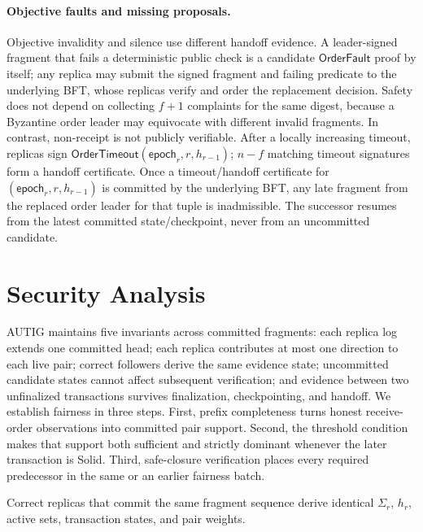 \paragraph{Objective faults and missing proposals.}
Objective invalidity and silence use different handoff evidence.  A
leader-signed fragment that fails a deterministic public check is a candidate
$\mathsf{OrderFault}$ proof by itself; any replica may submit the signed
fragment and failing predicate to the underlying BFT, whose replicas verify
and order the replacement decision.  Safety does not depend on collecting
$f+1$ complaints for the same digest, because a Byzantine order leader may
equivocate with different invalid fragments.  In contrast, non-receipt is not
publicly verifiable.  After a locally increasing timeout, replicas sign
$\mathsf{OrderTimeout}(\mathsf{epoch}_r,r,h_{r-1})$; $n-f$ matching timeout
signatures form a handoff certificate.  Once a timeout/handoff certificate for
$(\mathsf{epoch}_r,r,h_{r-1})$ is committed by the underlying BFT, any late
fragment from the replaced order leader for that tuple is inadmissible.  The
successor resumes from the latest committed state/checkpoint, never from an
uncommitted candidate.

\section{Security Analysis}
\label{sec:analysis}

AUTIG maintains five invariants across committed fragments: each replica log
extends one committed head; each replica contributes at most one direction to
each live pair; correct followers derive the same evidence state; uncommitted
candidate states cannot affect subsequent verification; and evidence between
two unfinalized transactions survives finalization, checkpointing, and
handoff.  We establish fairness in three steps.  First, prefix completeness
turns honest receive-order observations into committed pair support.  Second,
the threshold condition makes that support both sufficient and strictly
dominant whenever the later transaction is Solid.  Third, safe-closure
verification places every required predecessor in the same or an earlier
fairness batch.

\begin{theorem}
\label{thm:state-agreement-v4}
Correct replicas that commit the same fragment sequence derive identical
$\Sigma_r$, $h_r$, active sets, transaction states, and pair weights.
\end{theorem}

